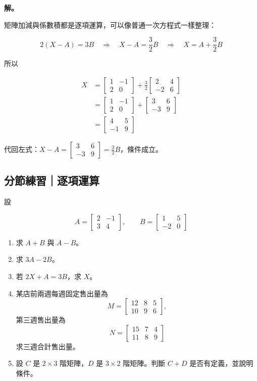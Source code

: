 \documentclass[11pt,a4paper]{article}
\begin{document}
\textbf{解。}

矩陣加減與係數積都是逐項運算，可以像普通一次方程式一樣整理：

\[
2(X-A)=3B
\quad\Longrightarrow\quad
X-A=\frac32B
\quad\Longrightarrow\quad
X=A+\frac32B
\]

所以

\[
\begin{aligned}
X
&=\begin{bmatrix}1&-1\\2&0\end{bmatrix}
+\frac32\begin{bmatrix}2&4\\-2&6\end{bmatrix}\\
&=\begin{bmatrix}1&-1\\2&0\end{bmatrix}
+\begin{bmatrix}3&6\\-3&9\end{bmatrix}\\
&=\begin{bmatrix}4&5\\-1&9\end{bmatrix}
\end{aligned}
\]

代回左式：\(X-A=\begin{bmatrix}3&6\\-3&9\end{bmatrix}=\frac32B\)，條件成立。

\subsection{分節練習｜逐項運算}\label{ux5206ux7bc0ux7df4ux7fd2ux9010ux9805ux904bux7b97}

設

\[
A=\begin{bmatrix}2&-1\\3&4\end{bmatrix},
\qquad
B=\begin{bmatrix}1&5\\-2&0\end{bmatrix}
\]

\begin{enumerate}
\def\labelenumi{\arabic{enumi}.}
\item
  求 \(A+B\) 與 \(A-B\)。
\item
  求 \(3A-2B\)。
\item
  若 \(2X+A=3B\)，求 \(X\)。
\item
  某店前兩週每週固定售出量為
  \[M=\begin{bmatrix}12&8&5\\10&9&6\end{bmatrix},\]
  第三週售出量為
  \[N=\begin{bmatrix}15&7&4\\11&8&9\end{bmatrix}\]
  求三週合計售出量。
\item
  設 \(C\) 是 \(2\times3\) 階矩陣，\(D\) 是 \(3\times2\) 階矩陣。判斷 \(C+D\) 是否有定義，並說明條件。
\end{enumerate}
\end{document}
